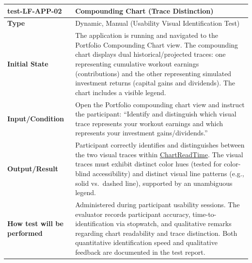 \documentclass[12pt, titlepage]{article}
\newcommand{\const}[1]{\hyperlink{const:#1}{\textsf{#1}}}
\begin{document}
\noindent\begin{tabularx}{\textwidth}{>{\raggedright\arraybackslash}p{3.5cm}X}
  \toprule
  \textbf{test-LF-APP-02}\label{test:LF-APP-02} & \textbf{Compounding Chart (Trace Distinction)}\\
  \midrule
  \textbf{Type} & Dynamic, Manual (Usability Visual Identification Test)\\
  \textbf{Initial State} & The application is running and navigated to the Portfolio Compounding Chart view. The compounding chart displays dual historical/projected traces: one representing cumulative workout earnings (contributions) and the other representing simulated investment returns (capital gains and dividends). The chart includes a visible legend.\\
  \textbf{Input/Condition} & Open the Portfolio compounding chart view and instruct the participant: ``Identify and distinguish which visual trace represents your workout earnings and which represents your investment gains/dividends.''\\
  \textbf{Output/Result} & Participant correctly identifies and distinguishes between the two visual traces within \const{ChartReadTime}. The visual traces must exhibit distinct color hues (tested for color-blind accessibility) and distinct visual line patterns (e.g., solid vs.\ dashed line), supported by an unambiguous legend.\\
  \textbf{How test will be performed} & Administered during participant usability sessions. The evaluator records participant accuracy, time-to-identification via stopwatch, and qualitative remarks regarding chart readability and trace distinction. Both quantitative identification speed and qualitative feedback are documented in the test report.\\
  \bottomrule
\end{tabularx}

\vspace{1em}
\end{document}
